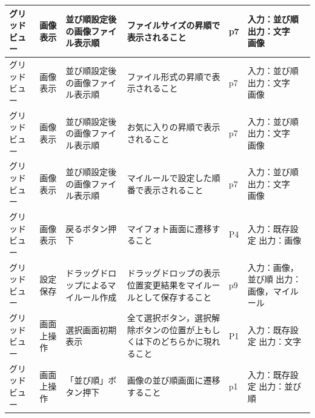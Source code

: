 \begin{table}[htbp]
\begin{tabular}{|p{8em}|p{7em}|p{9em}|p{9em}|p{3em}|p{12em}|}
    グリッドビュー & 画像表示  & 並び順設定後の画像ファイル表示順 & ファイルサイズの昇順で表示されること & p7    & 入力：並び順
出力：文字　画像 \bigstrut\\
    \hline
    グリッドビュー & 画像表示  & 並び順設定後の画像ファイル表示順 & ファイル形式の昇順で表示されること & p7    & 入力：並び順
出力：文字　画像 \bigstrut\\
    \hline
    グリッドビュー & 画像表示  & 並び順設定後の画像ファイル表示順 & お気に入りの昇順で表示されること & p7    & 入力：並び順
出力：文字　画像 \bigstrut\\
    \hline
    グリッドビュー & 画像表示  & 並び順設定後の画像ファイル表示順 & マイルールで設定した順番で表示されること & p7    & 入力：並び順
出力：文字　画像 \bigstrut\\
    \hline
    グリッドビュー & 画像表示  & 戻るボタン押下 & マイフォト画面に遷移すること & P4    & 入力：既存設定
出力：画像 \bigstrut\\
    \hline
    グリッドビュー & 設定保存  & ドラッグドロップによるマイルール作成 & ドラッグドロップの表示位置変更結果をマイルールとして保存すること & p9    & 入力：画像，並び順
出力：画像，マイルール \bigstrut\\
    \hline
    グリッドビュー & 画面上操作 & 選択画面初期表示 & 全て選択ボタン，選択解除ボタンの位置が上もしくは下のどちらかに現れること & P1    & 入力：既存設定
出力：文字 \bigstrut\\
    \hline
    グリッドビュー & 画面上操作 & 「並び順」ボタン押下 & 画像の並び順画面に遷移すること & p1    & 入力：既存設定
出力：並び順 \bigstrut\\
    \hline
    \end{tabular}%
  \label{tab:D-4-ER2-5}%
\end{table}%


